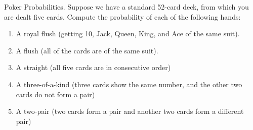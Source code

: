 \documentclass[11pt]{article}
\begin{document}
\begin{exercise}{Poker Probabilities.}
Suppose we have a standard 52-card deck, from which you are dealt five cards. Compute the probability of each of the following hands:
    \begin{enumerate}
        \item A royal flush (getting 10, Jack, Queen, King, and Ace of the same suit).
        \item A flush (all of the cards are of the same suit).
        \item A straight (all five cards are in consecutive order)
        \item A three-of-a-kind (three cards show the same number, and the other two cards do not form a pair)
        \item A two-pair (two cards form a pair and another two cards form a different pair)
    \end{enumerate}
\end{exercise}
\end{document}
